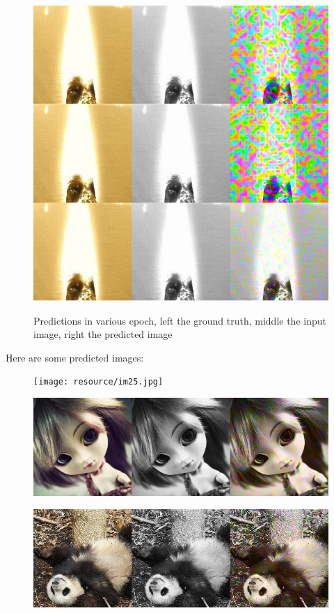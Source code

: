 \documentclass[12pt]{article}
\begin{document}
\begin{figure}[H]
 \centering
  \includegraphics[width=5.0in]{resource/trainstage.png}
 \label{yuvimage}
 \caption{Predictions in various epoch, left the ground truth, middle the input image, right the predicted image}
\end{figure}


Here are some predicted images:

\begin{figure}[H]
 \centering
 \texttt{[image: resource/im25.jpg]}
\end{figure}


\begin{figure}[H]
 \centering
 \includegraphics[width=5.0in]{resource/im43.jpg}
\end{figure}



\begin{figure}[H]
 \centering
 \includegraphics[width=5.0in]{resource/im89.jpg}
\end{figure}
\end{document}
